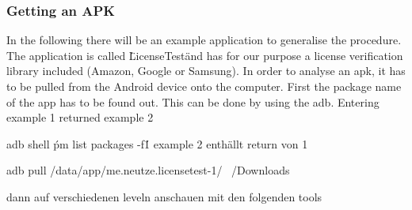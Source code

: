 \subsubsection{Getting an APK}\label{subsubsection:tools-apk}
In the following there will be an example application to generalise the procedure. The application is called \"LicenseTest\" and has for our purpose a license verification library included (Amazon, Google or Samsung).\newline
In order to analyse an \gls{apk}, it has to be pulled from the Android device onto the computer. First the package name of the app has to be found out. This can be done by using the \gls{adb}. Entering example 1 returned example 2

adb shell \'pm list packages -f\' 1
example 2 enthällt return von 1


adb pull /data/app/me.neutze.licensetest-1/ ~/Downloads


dann auf verschiedenen leveln anschauen mit den folgenden tools
